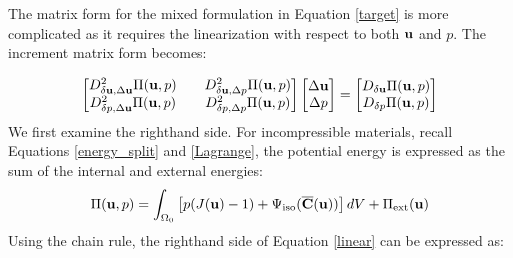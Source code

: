 The matrix form for the mixed formulation in Equation \ref{target} is more complicated as it requires the linearization with respect to both $\bold{u}$ and $p$. The increment matrix form becomes:

\begin{equation} \label{linear}
\begin{bmatrix}
D_{\delta\bold{u}, \Delta\bold{u}}^2 \Pi(\bold{u}, p)  && D_{\delta\bold{u}, \Delta{p}}^2 \Pi(\bold{u}, p)  \\ D_{\delta{p}, \Delta\bold{u}}^2 \Pi(\bold{u}, p)  && D_{\delta{p}, \Delta{p}}^2 \Pi(\bold{u}, p) 
\end{bmatrix}
\begin{bmatrix}
\Delta\bold{u} \\ \Delta{p}
\end{bmatrix}
= 
\begin{bmatrix}
D_{\delta\bold{u}}\Pi(\bold{u}, p) \\ D_{\delta{p}}\Pi(\bold{u}, p) 
\end{bmatrix}
\end{equation}
We first examine the righthand side. For incompressible materials, recall Equations \ref{energy_split} and \ref{Lagrange}, the potential energy is expressed as the sum of the internal and external energies:
\begin{equation} \label{split3}
\Pi(\bold{u}, p) = \int_{\Omega_0} \left[ p(J(\bold{u}) - 1) + \Psi_\mathrm{iso}(\overline{\bold{C}}(\bold{u}))\right] dV + \Pi_\mathrm{ext}(\bold{u})
\end{equation}
Using the chain rule, the righthand side of Equation \ref{linear} can be expressed as:

